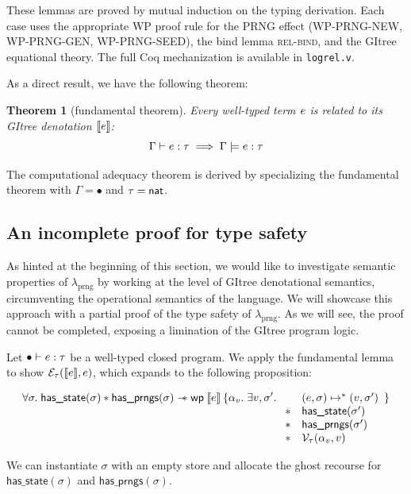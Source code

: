 \documentclass{article}
\theoremstyle{definition}
\theoremstyle{plain}
\newtheorem{theorem}{Theorem}[section]
\theoremstyle{remark}
\newcommand{\prng}{\mathrm{prng}}
\newcommand{\redu}{\mapsto}
\newcommand{\hasstate}{\textsf{has\_state}}
\newcommand{\hasprngs}{\textsf{has\_prngs}}
\begin{document}
These lemmas are proved by mutual induction on the typing derivation.
Each case uses the appropriate WP proof rule for the PRNG effect
(\textsc{WP-PRNG-NEW}, \textsc{WP-PRNG-GEN}, \textsc{WP-PRNG-SEED}),
the bind lemma \textsc{rel-bind}, and the GItree equational theory.
The full Coq mechanization is available in \texttt{logrel.v}.

As a direct result, we have the following theorem:
\begin{theorem}[fundamental theorem]
  Every well-typed term \(e\) is related to its GItree denotation \(\llbracket {e} \rrbracket\):
  \[
    {\Gamma}\vdash{e}\mathrel{:}{\tau} \implies {\Gamma}\models{e}\mathrel{:}{\tau} 
  \]
\end{theorem}

The computational adequacy theorem is derived by specializing the fundamental theorem with \(\Gamma = \bullet\) and \(\tau = { {\mathsf{nat}}}\).

\subsection{An incomplete proof for type safety}

As hinted at the beginning of this section, we would like to investigate semantic properties of \(\lambda_\prng\) by working at the level of GItree denotational semantics, circumventing the operational semantics of the language.
We will showcase this approach with a partial proof of the type safety of \(\lambda_\prng\).
As we will see, the proof cannot be completed, exposing a limination of the GItree program logic.\par

Let \({\bullet}\vdash{e}\mathrel{:}{\tau}\) be a well-typed closed program.
We apply the fundamental lemma to show \(\mathcal{E}_\tau(\llbracket {e} \rrbracket,e)\), which expands to the following proposition:

\[
  \forall \sigma.\;
  \hasstate(\sigma) \star \hasprngs(\sigma) \wand
  \wpre{\sem{e}}{\alpha_v.\; \exists v,\sigma'.\;
    \begin{array}[t]{ll}
        &(e,\sigma) \redu^\ast (v,\sigma')\\
      \star & \hasstate(\sigma')\\
      \star & \hasprngs(\sigma')\\
      \star & \mathcal{V}_{\type}(\alpha_v,v)
  \end{array}}
\]

We can instantiate \(\sigma\) with an empty store and allocate the ghost recourse for \(\hasstate(\sigma)\) and \(\hasprngs(\sigma)\).
\end{document}
